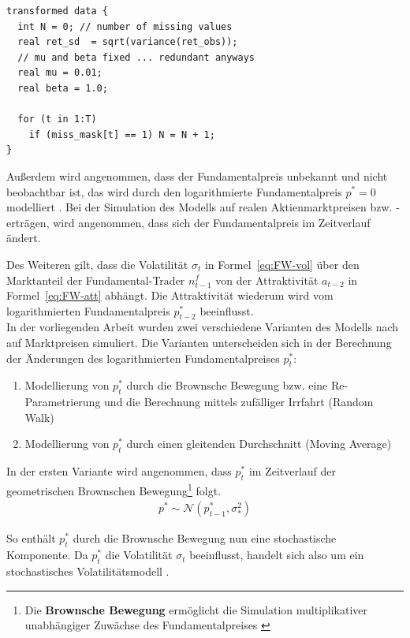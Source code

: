 \documentclass[ngerman]{ttlab-qualify}
\begin{document}
\begin{lstlisting}[style=custom]
transformed data {
  int N = 0; // number of missing values
  real ret_sd  = sqrt(variance(ret_obs));
  // mu and beta fixed ... redundant anyways
  real mu = 0.01;
  real beta = 1.0;

  for (t in 1:T)
    if (miss_mask[t] == 1) N = N + 1;
}
\end{lstlisting}
Außerdem wird angenommen, dass der Fundamentalpreis unbekannt und nicht beobachtbar ist, das wird durch den logarithmierte Fundamentalpreis $p^*=0$ modelliert \parencite{bertschinger:2018, FW:2011}. Bei der Simulation des Modells auf realen Aktienmarktpreisen bzw. -erträgen, wird angenommen, dass sich der Fundamentalpreis im Zeitverlauf ändert.

Des Weiteren gilt, dass die Volatilität $\sigma_t$ in Formel~\ref{eq:FW-vol} über den Marktanteil der Fundamental-Trader $n_{t-1}^f$ von der Attraktivität $a_{t-2}$ in Formel~\ref{eq:FW-att} abhängt. Die Attraktivität wiederum wird vom logarithmierten Fundamentalpreis $p_{t-2}^*$ beeinflusst. \\ 

In der vorliegenden Arbeit wurden zwei verschiedene Varianten des Modells nach \parencite{bertschinger:2018} auf Marktpreisen simuliert. Die Varianten unterscheiden sich in der Berechnung der Änderungen des logarithmierten Fundamentalpreises $p_t^*$:
\begin{enumerate}
\item Modellierung von $p_t^*$ durch die Brownsche Bewegung bzw. eine Re-Parametrierung und die Berechnung mittels zufälliger Irrfahrt (Random Walk)
\item Modellierung von $p_t^*$ durch einen gleitenden Durchschnitt (Moving Average)
\end{enumerate}
In der ersten Variante wird angenommen, dass $p_t^*$ im Zeitverlauf der geometrischen Brownschen Bewegung\footnote{Die \textbf{Brownsche Bewegung} ermöglicht die Simulation multiplikativer unabhängiger Zuwächse des Fundamentalpreises \parencite{BrownianMotion}} folgt.
\begin{align}
\label{eq:FW-p_star}
p^*\sim \mathcal{N}(p_{t-1}^*,\sigma_*^2)
\end{align}

So enthält $p_t^*$ durch die Brownsche Bewegung nun eine stochastische Komponente. Da $p_t^*$ die Volatilität $\sigma_t$ beeinflusst, handelt sich also um ein stochastisches Volatilitätsmodell \parencite{bertschinger:2018, FW:2011}.\\ 
\end{document}
